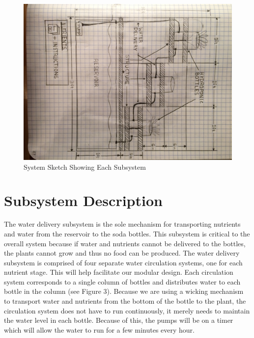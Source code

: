 \documentclass[12pt]{article}
\begin{document}
{    \pagebreak
    \begin{figure}[H]
        \centering
        \includegraphics[width=163mm]{resources/system-overview.jpg}
        \caption{System Sketch Showing Each Subsystem}
    \end{figure}
}


\section{Subsystem Description}



The water delivery subsystem is the sole mechanism for transporting nutrients and water from the
reservoir to the soda bottles. This subsystem is critical to the overall system because if water and
nutrients cannot be delivered to the bottles, the plants cannot grow and thus no food can be
produced. The water delivery subsystem is comprised of four separate water circulation systems, one
for each nutrient stage. This will help facilitate our modular design. Each circulation system
corresponds to a single column of bottles and distributes water to each bottle in the column (see
Figure 3). Because we are using a wicking mechanism to transport water and nutrients from the
bottom of the bottle to the plant, the circulation system does not have to run continuously, it
merely needs to maintain the water level in each bottle. Because of this, the pumps will be on a
timer which will allow the water to run for a few minutes every hour.
\end{document}
